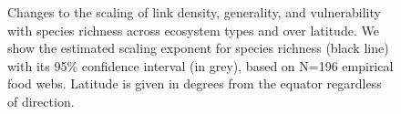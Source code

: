 \documentclass[12pt]{article}
\begin{document}
\begin{figure}[h]
\caption{Changes to the scaling of link density, generality, and vulnerability with species richness across ecosystem
types and over latitude. We show the estimated scaling exponent for species richness (black
line) with its 95\% confidence interval (in grey), based on N=196 empirical food webs.
Latitude is given in degrees from the equator regardless of direction.} \label{S} \end{figure}
\end{document}

